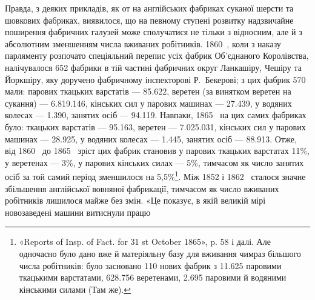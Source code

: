 Правда, з деяких прикладів, як от на англійських фабриках
суканої шерсти та шовкових фабриках, виявилося, що на певному
ступені розвитку надзвичайне поширення фабричних галузей
може сполучатися не тільки з відносним, але й з абсолютним
зменшенням числа вживаних робітників. 1860~, коли з наказу
парляменту розпочато спеціяльний перепис усіх фабрик Об’єднаного
Королівства, налічувалося 652 фабрики в тій частині
фабричних округ Ланкашіру, Чешіру та Йоркшіру, яку доручено
фабричному інспекторові Р.~Бекерові; з цих фабрик 570 мали:
парових ткацьких варстатів — \num{85.622}, веретен (за винятком веретен
на сукання) — \num{6.819.146}, кінських сил у парових машинах —
\num{27.439}, у водяних колесах — \num{1.390}, занятих осіб — \num{94.119}.
Навпаки, 1865~ на цих самих фабриках було: ткацьких варстатів
— \num{95.163}, веретен — \num{7.025.031}, кінських сил у парових машинах
— \num{28.925}, у водяних колесах — \num{1.445}, занятих осіб —
\num{88.913}. Отже, від 1860~ до 1865~ зріст цих фабрик становив
у парових ткацьких варстатах 11\%, у веретенах — 3\%, у парових
кінських силах — 5\%, тимчасом як число занятих осіб за той
самий період зменшилося на 5,5\%\footnote{
«Reports of Insp. of Fact. for 31 st October 1865», p. 58 і далі.
Але одночасно було дано вже й матеріяльну базу для вживання чимраз
більшого числа робітників: було засновано 110 нових фабрик з \num{11.625} паровими
ткацькими варстатами, \num{628.756} веретенами, \num{2.695} паровими й водяними
кінськими силами (Там же).
}. Між 1852 і 1862~ сталося
значне збільшення англійської вовняної фабрикації, тимчасом як
число вживаних робітників лишилося майже без змін. «Це показує,
в якій великій мірі новозаведені машини витиснули працю
\parbreak{}  %
